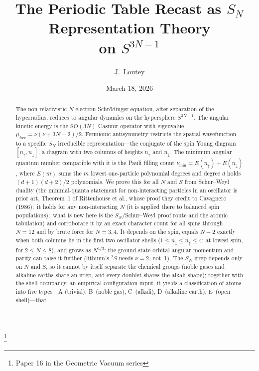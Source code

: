 \documentclass[aps,prl,twocolumn,superscriptaddress,longbibliography]{revtex4-2}
\newcommand{\mufree}{\mu_{\mathrm{free}}}
\begin{document}
\title{The Periodic Table Recast as $S_N$ Representation Theory\\
on $S^{3N-1}$}
\thanks{Paper 16 in the Geometric Vacuum series}

\author{J.~Loutey}

\date{March 18, 2026}


\begin{abstract}
The non-relativistic $N$-electron Schr\"odinger equation, after
separation of the hyperradius, reduces to angular dynamics on the
hypersphere $S^{3N-1}$.  The angular kinetic energy is the
$\mathrm{SO}(3N)$ Casimir operator with eigenvalue
$\mufree = \nu(\nu + 3N - 2)/2$.  Fermionic antisymmetry restricts
the spatial wavefunction to a specific $S_N$ irreducible
representation---the conjugate of the spin Young diagram
$[n_\uparrow, n_\downarrow]$, a diagram with two columns of heights
$n_\uparrow$ and $n_\downarrow$.  The minimum angular quantum number
compatible with it is the Pauli filling count
$\nu_{\min} = E(n_\uparrow) + E(n_\downarrow)$, where $E(m)$ sums the
$m$ lowest one-particle polynomial degrees and degree $d$ holds
$(d+1)(d+2)/2$ polynomials.  We prove this for all $N$ and $S$ from
Schur--Weyl duality (the minimal-quanta statement for non-interacting
particles in an oscillator is prior art, Theorem~1 of Rittenhouse et
al., whose proof they credit to Cavagnero (1986);\ it holds for any non-interacting $N$ (it is applied
there to balanced spin populations);\ what is new here
is the $S_N$/Schur--Weyl proof route and the atomic tabulation)
and corroborate it by an exact character count for all spins through
$N = 12$ and by brute force for $N = 3, 4$.  It depends on the spin,
equals $N-2$ exactly when both columns lie in the first two oscillator
shells ($1 \le n_\downarrow \le n_\uparrow \le 4$; at lowest spin, for
$2 \le N \le 8$), and grows as $N^{4/3}$; the ground-state orbital
angular momentum and parity can raise it further (lithium's ${}^2S$
needs $\nu = 2$, not~1).  The $S_N$ irrep depends only on $N$ and $S$,
so it cannot by itself separate the chemical groups (noble gases and
alkaline earths share an irrep, and every doublet shares the alkali
shape); together with the shell occupancy, an empirical configuration
input, it yields a classification of atoms into five types---A (trivial),
B~(noble gas), C~(alkali), D~(alkaline earth), E~(open shell)---that

\end{abstract}
\end{document}
